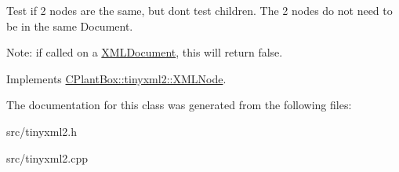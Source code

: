 Test if 2 nodes are the same, but don\textquotesingle{}t test children. The 2 nodes do not need to be in the same Document.

Note\+: if called on a \hyperlink{classCPlantBox_1_1tinyxml2_1_1XMLDocument}{X\+M\+L\+Document}, this will return false. 

Implements \hyperlink{classCPlantBox_1_1tinyxml2_1_1XMLNode_a1019a06dab15152f06f3a879bf9a85c9}{C\+Plant\+Box\+::tinyxml2\+::\+X\+M\+L\+Node}.



The documentation for this class was generated from the following files\+:\begin{DoxyCompactItemize}
\item 
src/tinyxml2.\+h\item 
src/tinyxml2.\+cpp\end{DoxyCompactItemize}
